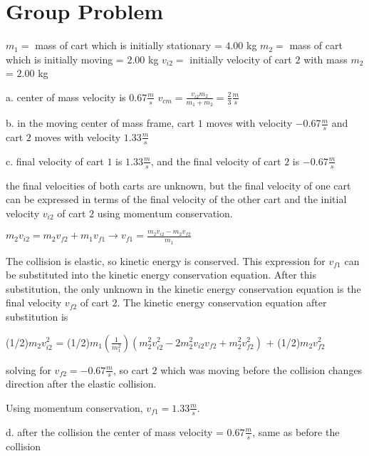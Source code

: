 \chapter{Group Problem}
\label{Group Problem}
$m_{1} = $ mass of cart which is initially stationary = $4.00$ kg
$m_{2} = $ mass of cart which is initially moving = $2.00$ kg
$v_{i2} = $ initially velocity of cart $2$ with mass $m_{2}$ = $2.00$ kg


a. center of mass velocity is $0.67 \frac{m}{s}$
$v_{cm} = \frac{v_{i2}m_{2}}{m_{1} + m_{2}} = \frac{2}{3} \frac{m}{s}$

b. in the moving center of mass frame, cart $1$ moves with velocity $-0.67 \frac{m}{s}$
and cart $2$ moves with velocity $1.33 \frac{m}{s}$

c. final velocity of cart $1$ is $1.33 \frac{m}{s}$, and the final velocity
of cart $2$ is $-0.67 \frac{m}{s}$

the final velocities of both carts are unknown, but the final velocity of one cart
can be expressed in terms of the final velocity of the other cart and the initial
velocity $v_{i2}$ of cart $2$ using momentum conservation.

$m_{2}v_{i2} = m_{2}v_{f2} + m_{1}v_{f1} \rightarrow v_{f1} = \frac{m_{2}v_{i2} - m_{2}v_{f2}}{m_{1}}$

The collision is elastic, so kinetic energy is conserved.  This expression for $v_{f1}$
can be substituted into the kinetic energy conservation equation.  After this substitution,
the only unknown in the kinetic energy conservation equation is the final velocity $v_{f2}$
of cart $2$.  The kinetic energy conservation equation after substitution is

(1/2)$m_{2}v_{i2}^{2}$ = (1/2)$m_{1}(\frac{1}{m_{1}^{2}})(m_{2}^{2}v_{i2}^{2} - 2m_{2}^{2}v_{i2}v_{f2} + m_{2}^{2}v_{f2}^{2})$ + (1/2)$m_{2}v_{f2}^{2}$

solving for $v_{f2} = -0.67 \frac{m}{s}$, so cart $2$ which was moving before the collision
changes direction after the elastic collision.

Using momentum conservation, $v_{f1} = 1.33 \frac{m}{s}$.


d. after the collision the center of mass velocity = $0.67 \frac{m}{s}$, same as before the collision

